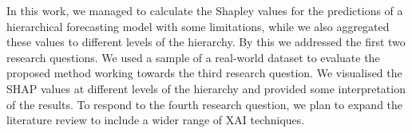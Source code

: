 %




In this work, we managed to calculate the Shapley values for the predictions of a hierarchical forecasting model
with some limitations, while we also aggregated these values to different levels of the hierarchy.
By this we addressed the first two research questions.
We used a sample of a real-world dataset to evaluate the proposed method working towards the third research question.
We visualised the SHAP values at different levels of the hierarchy and provided some interpretation of the results.
To respond to the fourth research question, we plan to expand the literature review to include a wider range of XAI techniques.


